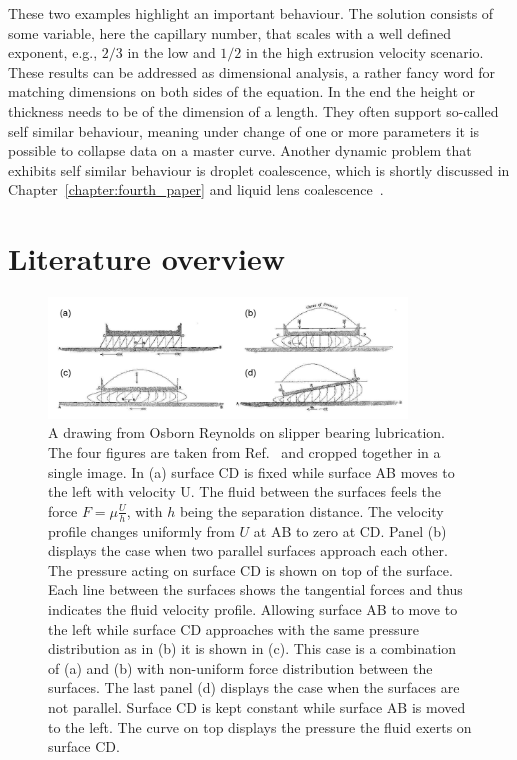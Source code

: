 These two examples highlight an important behaviour.
The solution consists of some variable, here the capillary number, that scales with a well defined exponent, e.g., $2/3$ in the low and $1/2$ in the high extrusion velocity scenario.
These results can be addressed as dimensional analysis, a rather fancy word for matching dimensions on both sides of the equation.
In the end the height or thickness needs to be of the dimension of a length.
They often support so-called self similar behaviour, meaning under change of one or more parameters it is possible to collapse data on a master curve. 
Another dynamic problem that exhibits self similar behaviour is droplet coalescence, which is shortly discussed in Chapter~\ref{chapter:fourth_paper} and liquid lens coalescence~\cite{hackSelfSimilarLiquidLens2020, scheelViscousInertialCoalescence2023}. 
\section{Literature overview}
\label{section:literature}
\begin{figure}
    \centering
    \includegraphics[width=0.85\textwidth]{graphics/reynolds_slip_bearing.pdf}
    \caption{A drawing from Osborn Reynolds on slipper bearing lubrication.
    The four figures are taken from Ref.~\cite{reynoldsTheoryLubricationIts1886} and cropped together in a single image.
    In (a) surface CD is fixed while surface AB moves to the left with velocity U. 
    The fluid between the surfaces feels the force $F = \mu \frac{U}{h}$, with $h$ being the separation distance.
    The velocity profile changes uniformly from $U$ at AB to zero at CD. 
    Panel (b) displays the case when two parallel surfaces approach each other.
    The pressure acting on surface CD is shown on top of the surface.
    Each line between the surfaces shows the tangential forces and thus indicates the fluid velocity profile.
    Allowing surface AB to move to the left while surface CD approaches with the same pressure distribution as in (b) it is shown in (c).
    This case is a combination of (a) and (b) with non-uniform force distribution between the surfaces.
    The last panel (d) displays the case when the surfaces are not parallel.
    Surface CD is kept constant while surface AB is moved to the left.
    The curve on top displays the pressure the fluid exerts on surface CD.}
    \label{fig:reynolds_work}
\end{figure}
